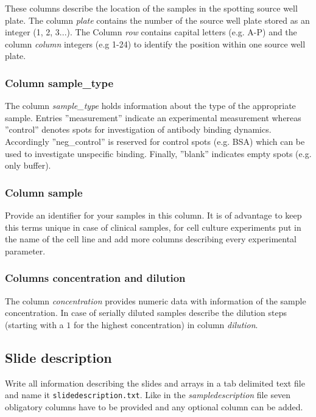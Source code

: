 \documentclass[12pt]{article}
\newcommand{\Rfunarg}[1]{{\textit{#1}}}
\begin{document}
These columns describe the location of the samples in the spotting source well plate.
The column \Rfunarg{plate} contains the number of the source well plate stored as an integer (1, 2, 3...).
The Column \Rfunarg{row} contains capital letters (e.g. A-P) and the column \Rfunarg{column} integers (e.g 1-24) to identify the position within one source well plate.

\subsubsection{Column sample\_type}

The column \Rfunarg{sample\_type} holds information about the type of the appropriate sample. Entries ''measurement'' indicate an experimental measurement whereas ''control'' denotes spots for investigation of antibody binding dynamics. Accordingly ''neg\_control'' is reserved for control spots (e.g. BSA) which can be used to investigate unspecific binding. Finally, ''blank'' indicates empty spots (e.g. only buffer).

\subsubsection{Column sample}

Provide an identifier for your samples in this column. It is of advantage to keep this terms unique
in case of clinical samples, for cell culture experiments put in the name of the cell line and
add more columns describing every experimental parameter.

\subsubsection{Columns concentration and dilution}

The column \Rfunarg{concentration} provides numeric data with information of the sample concentration. In case of serially diluted samples describe the dilution steps (starting with a $1$ for the highest concentration) in column \Rfunarg{dilution}.

\subsection{Slide description}

Write all information describing the slides and arrays in a tab delimited text file and name it \texttt{slidedescription.txt}.
Like in the \emph{sampledescription} file seven obligatory columns have to be provided and any optional column can be added.
\end{document}
